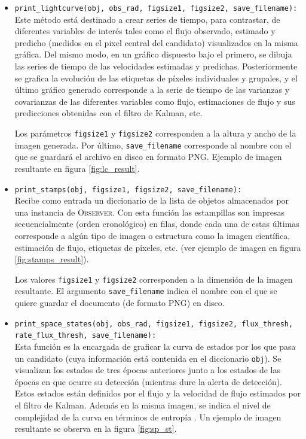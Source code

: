 \begin{itemize}
\item \texttt{print\_lightcurve(obj, obs\_rad, figsize1, figsize2, save\_filename):}\\

Este m\'etodo est\'a destinado a crear series de tiempo, para contrastar, de diferentes variables de inter\'es tales como el flujo observado, estimado y predicho (medidos en el pixel central del candidato) visualizados en la misma gr\'afica. Del mismo modo, en un gr\'afico dispuesto bajo el primero, se dibuja las series de tiempo de las velocidades estimadas y predichas. Posteriormente se grafica la evoluci\'on de las etiquetas de p\'ixeles individuales y grupales, y el \'ultimo gr\'afico generado corresponde a la serie de tiempo de las varianzas y covarianzas de las diferentes variables como flujo, estimaciones de flujo y sus predicciones obtenidas con el filtro de Kalman, etc.
\bigskip

 Los par\'ametros \texttt{figsize1} y \texttt{figsize2} corresponden a la altura y ancho de la imagen generada. Por \'ultimo, \texttt{save\_filename} corresponde al nombre con el que se guardar\'a el archivo en disco en formato PNG. Ejemplo de imagen resultante en figura \ref{fig:lc_result}.
 
\item \texttt{print\_stamps(obj, figsize1, figsize2, save\_filename):}\\
Recibe como entrada un diccionario de la lista de objetos almacenados por una instancia de \textsc{Observer}. Con esta funci\'on las estampillas son impresas secuencialmente (orden cronol\'ogico) en filas, donde cada una de estas \'ultimas corresponde a alg\'un tipo de imagen o estructura como la imagen cient\'ifica, estimaci\'on de flujo, etiquetas de p\'ixeles, etc. (ver ejemplo de imagen en figura \ref{fig:stamps_result}).
\bigskip

Los valores \texttt{figsize1} y \texttt{figsize2} corresponden a la dimensi\'on de la imagen resultante. El argumento \texttt{save\_filename} indica el nombre con el que se quiere guardar el documento (de formato PNG) en disco. 

\item \texttt{print\_space\_states(obj, obs\_rad, figsize1, figsize2, flux\_thresh, rate\_flux\_thresh, save\_filename):}\\
Esta funci\'on es la encargada de graficar la curva de estados por los que pasa un candidato (cuya informaci\'on est\'a contenida en el diccionario \texttt{obj}). Se visualizan los estados de  tres \'epocas anteriores junto a los estados de las \'epocas en que ocurre su detecci\'on (mientras dure la alerta de detecci\'on). Estos estados est\'an definidos por el flujo y la velocidad de flujo estimados por el filtro de Kalman. Adem\'as en la misma imagen, se indica el nivel de complejidad de la curva en t\'erminos de entrop\'ia \cite{balestrino}. Un ejemplo de imagen resultante se observa en la figura \ref{fig:sp_st}.
\bigskip


\end{itemize}
